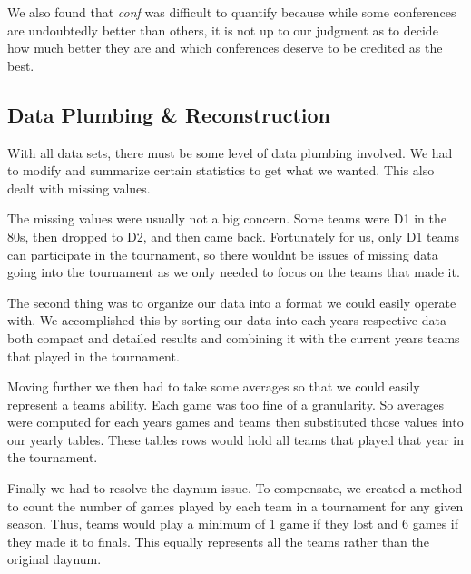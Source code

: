 \documentclass[]{scrartcl}
\begin{document}
We also found that {\textit{conf}} was difficult to quantify because while some conferences are undoubtedly better than others, it is not up to our judgment as to decide how much better they are and which conferences deserve to be credited as the best.
\subsection*{Data Plumbing \& Reconstruction}

With all data sets, there must be some level of data plumbing involved. We had to modify and summarize certain statistics to get what we wanted. This also dealt with missing values.

The missing values were usually not a big concern. Some teams were D1 in the 80s, then dropped to D2, and then came back. Fortunately for us, only D1 teams can participate in the tournament, so there wouldnt be issues of missing data going into the tournament as we only needed to focus on the teams that made it.

The second thing was to organize our data into a format we could easily operate with. We accomplished this by sorting our data into each years respective data both compact and detailed results and combining it with the current years teams that played in the tournament.

Moving further we then had to take some averages so that we could easily represent a teams ability. Each game was too fine of a granularity. So averages were computed for each years games and teams then substituted those values into our yearly tables. These tables rows would hold all teams that played that year in the tournament.

Finally we had to resolve the daynum issue. To compensate, we created a method to count the number of games played by each team in a tournament for any given season. Thus, teams would play a minimum of 1 game if they lost and 6 games if they made it to finals. This equally represents all the teams rather than the original daynum.
\end{document}
